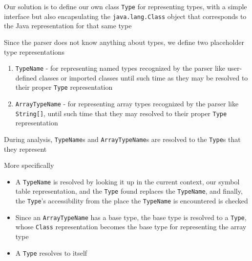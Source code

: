 \documentclass[8pt,a4paper,compress]{beamer}
\begin{document}
\begin{frame}[fragile]
\pause

Our solution is to define our own class \lstinline{Type} for representing types, with a simple interface but also encapsulating the \lstinline{java.lang.Class} object that corresponds to the Java representation for that same type

\pause
\bigskip

Since the parser does not know anything about types, we define two placeholder type representations
\begin{enumerate}
\item \lstinline{TypeName} - for representing named types recognized by the parser like user-defined classes or imported classes until such time as they may be resolved to their proper \lstinline{Type} representation
\item \lstinline{ArrayTypeName} - for representing array types recognized by the parser like \lstinline{String[]}, until such time that they may resolved to their proper \lstinline{Type} representation
\end{enumerate}

\pause
\bigskip

During analysis, \lstinline{TypeName}s and \lstinline{ArrayTypeName}s are resolved to the \lstinline{Type}s that they represent

\pause
\bigskip

More specifically
\begin{itemize}
\item A \lstinline{TypeName} is resolved by looking it up in the current context, our symbol table representation, and the \lstinline{Type} found replaces the \lstinline{TypeName}, and finally, the \lstinline{Type}'s accessibility from the place the \lstinline{TypeName} is encountered is checked
\item Since an \lstinline{ArrayTypeName} has a base type, the base type is resolved to a \lstinline{Type}, whose \lstinline{Class} representation becomes the base type for representing the array type
\item A \lstinline{Type} resolves to itself
\end{itemize}
\end{frame}
\end{document}

